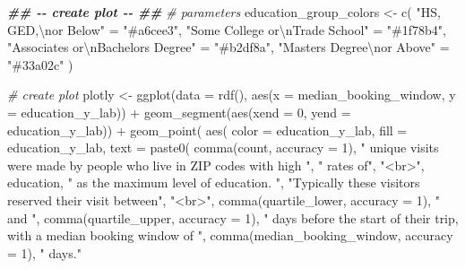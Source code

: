 \documentclass[
  11 pt,
  openany]{book}
\newenvironment{Shaded}{\begin{snugshade}}{\end{snugshade}}
\newcommand{\AttributeTok}[1]{\textcolor[rgb]{0.77,0.63,0.00}{#1}}
\newcommand{\CommentTok}[1]{\textcolor[rgb]{0.56,0.35,0.01}{\textit{#1}}}
\newcommand{\DecValTok}[1]{\textcolor[rgb]{0.00,0.00,0.81}{#1}}
\newcommand{\DocumentationTok}[1]{\textcolor[rgb]{0.56,0.35,0.01}{\textbf{\textit{#1}}}}
\newcommand{\FunctionTok}[1]{\textcolor[rgb]{0.00,0.00,0.00}{#1}}
\newcommand{\NormalTok}[1]{#1}
\newcommand{\OtherTok}[1]{\textcolor[rgb]{0.56,0.35,0.01}{#1}}
\newcommand{\SpecialCharTok}[1]{\textcolor[rgb]{0.00,0.00,0.00}{#1}}
\newcommand{\StringTok}[1]{\textcolor[rgb]{0.31,0.60,0.02}{#1}}
\begin{document}
\begin{Shaded}
\begin{Highlighting}[]
\DocumentationTok{\#\# {-}{-} create plot {-}{-} \#\#}
\CommentTok{\# parameters}
\NormalTok{education\_group\_colors }\OtherTok{\textless{}{-}}
  \FunctionTok{c}\NormalTok{(}
    \StringTok{"HS, GED,}\SpecialCharTok{\textbackslash{}n}\StringTok{or Below"} \OtherTok{=} \StringTok{"\#a6cee3"}\NormalTok{,}
    \StringTok{"Some College or}\SpecialCharTok{\textbackslash{}n}\StringTok{Trade School"}  \OtherTok{=} \StringTok{"\#1f78b4"}\NormalTok{,}
    \StringTok{"Associates or}\SpecialCharTok{\textbackslash{}n}\StringTok{Bachelors Degree"} \OtherTok{=} \StringTok{"\#b2df8a"}\NormalTok{,}
    \StringTok{"Masters Degree}\SpecialCharTok{\textbackslash{}n}\StringTok{or Above"} \OtherTok{=} \StringTok{"\#33a02c"}
\NormalTok{  )}

\CommentTok{\# create plot}
\NormalTok{plotly }\OtherTok{\textless{}{-}} \FunctionTok{ggplot}\NormalTok{(}\AttributeTok{data =} \FunctionTok{rdf}\NormalTok{(),}
                 \FunctionTok{aes}\NormalTok{(}\AttributeTok{x =}\NormalTok{ median\_booking\_window,}
                     \AttributeTok{y =}\NormalTok{ education\_y\_lab)) }\SpecialCharTok{+}
  \FunctionTok{geom\_segment}\NormalTok{(}\FunctionTok{aes}\NormalTok{(}\AttributeTok{xend =} \DecValTok{0}\NormalTok{, }\AttributeTok{yend =}\NormalTok{ education\_y\_lab)) }\SpecialCharTok{+}
  \FunctionTok{geom\_point}\NormalTok{(}
    \FunctionTok{aes}\NormalTok{(}
      \AttributeTok{color =}\NormalTok{ education\_y\_lab,}
      \AttributeTok{fill =}\NormalTok{ education\_y\_lab,}
      \AttributeTok{text =} \FunctionTok{paste0}\NormalTok{(}
        \FunctionTok{comma}\NormalTok{(count, }\AttributeTok{accuracy =} \DecValTok{1}\NormalTok{),}
        \StringTok{" unique visits were made by people who live in ZIP codes with high "}\NormalTok{, }
        \StringTok{" rates of"}\NormalTok{,}
        \StringTok{"\textless{}br\textgreater{}"}\NormalTok{, education, }
        \StringTok{" as the maximum level of education. "}\NormalTok{, }
        \StringTok{"Typically these visitors reserved their visit between"}\NormalTok{,}
        \StringTok{"\textless{}br\textgreater{}"}\NormalTok{, }\FunctionTok{comma}\NormalTok{(quartile\_lower, }\AttributeTok{accuracy =} \DecValTok{1}\NormalTok{), }\StringTok{" and "}\NormalTok{, }
        \FunctionTok{comma}\NormalTok{(quartile\_upper, }\AttributeTok{accuracy =} \DecValTok{1}\NormalTok{),}
        \StringTok{" days before the start of their trip, with a median booking window of "}\NormalTok{, }
        \FunctionTok{comma}\NormalTok{(median\_booking\_window, }\AttributeTok{accuracy =} \DecValTok{1}\NormalTok{),  }\StringTok{" days."}

\end{Highlighting}
\end{Shaded}
\end{document}
